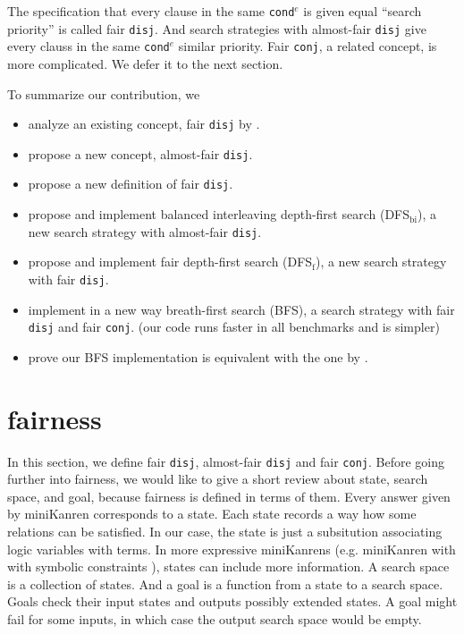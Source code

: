 \documentclass[format=acmlarge, review=true, authordraft=true]{acmart}
\newcommand{\conde}{\texttt{cond$^e$}}
\newcommand{\conj}{\texttt{conj}}
\newcommand{\disj}{\texttt{disj}}
\begin{document}
The specification that every clause in the same \conde{} is given equal 
``search priority'' is called fair \disj{}. And search strategies with 
almost-fair \disj{} give every clauss in the same \conde{} similar priority. 
Fair \conj{}, a related concept, is more complicated. We defer it to the next 
section.

To summarize our contribution, we
\begin{itemize}
	\item analyze an existing concept, fair \disj{} by 
	\citet{seres1999algebra}.
	\item propose a new concept, almost-fair \disj{}.
	\item propose a new definition of fair \disj{}.
	\item propose and implement balanced interleaving depth-first search 
	(DFS$_\textrm{bi}$), a new search strategy with almost-fair \disj{}.
	\item propose and implement fair depth-first search (DFS$_\textrm{f}$), a 
	new search strategy with fair \disj{}.
	\item implement in a new way breath-first search (BFS), a search strategy 
	with fair \disj{} and fair \conj{}.
	(our code runs faster in all benchmarks and is simpler)
	\item prove our BFS implementation is equivalent with the one by 
	\citet{seres1999algebra}.
\end{itemize}
 

\section{fairness}

In this section, we define fair \disj{}, almost-fair \disj{} and fair \conj{}. 
Before going further into fairness, we would like to give a short review about 
state, search space, and goal, because fairness is defined in terms of them. 
Every answer given by miniKanren corresponds to a state. Each state records a 
way how some relations can be satisfied. In our case, the state is just a 
subsitution associating logic variables with terms. In more expressive 
miniKanrens (e.g. miniKanren with with symbolic constraints 
\citep{hemann2017framework}), states can include more information. A search 
space is a collection of states. And a goal is a function from a state to a 
search space. Goals check their input states and outputs possibly extended 
states. A goal might fail for some inputs, in which case the output search 
space would be empty.
\end{document}
